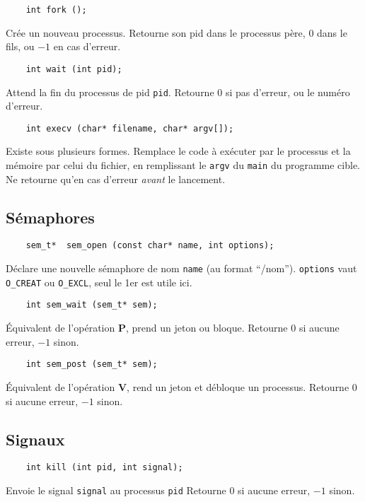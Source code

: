 \documentclass[10pt,twocolumn,a4paper]{article}
\begin{document}
\begin{lstlisting}
    int fork ();
\end{lstlisting}

Cr\'ee un nouveau processus.
Retourne son pid dans le processus p\`ere, $0$ dans le fils, ou $-1$ en cas d'erreur.

\begin{lstlisting}
    int wait (int pid);
\end{lstlisting}

Attend la fin du processus de pid \texttt{pid}.
Retourne 0 si pas d'erreur, ou le num\'ero d'erreur.

\begin{lstlisting}
    int execv (char* filename, char* argv[]);
\end{lstlisting}

Existe sous plusieurs formes.
Remplace le code à exécuter par le processus et la mémoire par celui du fichier, en remplissant le \texttt{argv} du \texttt{main} du programme cible.
Ne retourne qu'en cas d'erreur \emph{avant} le lancement.

\subsection{Sémaphores}

\begin{lstlisting}
    sem_t*  sem_open (const char* name, int options);
\end{lstlisting}
Déclare une nouvelle sémaphore de nom \texttt{name} (au format ``/nom''). 
\texttt{options} vaut \texttt{O\_CREAT} ou \texttt{O\_EXCL}, seul le 1er est utile ici.


\begin{lstlisting}
    int sem_wait (sem_t* sem);
\end{lstlisting}
\'Equivalent de l'opération \textbf{P}, prend un jeton ou bloque.
Retourne $0$ si aucune erreur, $-1$ sinon.


\begin{lstlisting}
    int sem_post (sem_t* sem);
\end{lstlisting}
\'Equivalent de l'opération \textbf{V}, rend un jeton et débloque un processus.
Retourne $0$ si aucune erreur, $-1$ sinon.

\subsection{Signaux}

\begin{lstlisting}
    int kill (int pid, int signal);
\end{lstlisting}
Envoie le signal \texttt{signal} au processus \texttt{pid}
Retourne $0$ si aucune erreur, $-1$ sinon.
\end{document}
